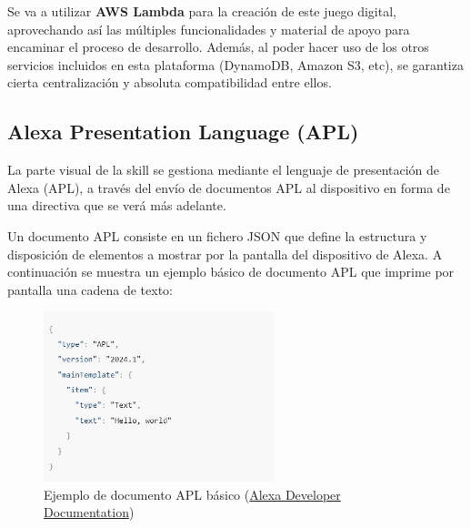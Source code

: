 Se va a utilizar \textbf{AWS Lambda} para la creación de este juego digital, aprovechando así las múltiples funcionalidades y material de apoyo para encaminar el proceso de desarrollo. Además, al poder hacer uso de los otros servicios incluidos en esta plataforma (DynamoDB, Amazon S3, etc), se garantiza cierta centralización y absoluta compatibilidad entre ellos.

\subsection{Alexa Presentation Language (APL)}

La parte visual de la skill se gestiona mediante el lenguaje de presentación de Alexa (APL), a través del envío de documentos APL al dispositivo en forma de una directiva que se verá más adelante.

Un documento APL consiste en un fichero JSON que define la estructura y disposición de elementos a mostrar por la pantalla del dispositivo de Alexa.
A continuación se muestra un ejemplo básico de documento APL que imprime por pantalla una cadena de texto:

\begin{figure}[H]
	\centering
	\includegraphics[width=0.6\textwidth]{imgs/apl-example.JPG}
	\caption{Ejemplo de documento APL básico (\href{https://developer.amazon.com/en-US/docs/alexa/alexa-presentation-language/apl-document.html}{Alexa Developer Documentation})}
	\label{fig:apl-ejemplo}
\end{figure}

